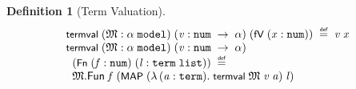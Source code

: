 \documentclass[letterpaper]{article}
\newtheorem{defn}{Definition}
\renewcommand{\HOLConst}[1]{{\textsf{\upshape\small #1}}}
\newenvironment{holmath}{\begin{displaymath}\begin{array}{l}}{\end{array}\end{displaymath}\ignorespacesafterend}
\begin{document}
\begin{defn}[Term Valuation]
\begin{holmath}
  \HOLConst{termval}\;(\HOLFreeVar{\ensuremath{\mathfrak{M}}} :\ensuremath{\alpha}\;\HOLTyOp{model})\;(\HOLFreeVar{v} :\HOLTyOp{num}\;\ensuremath{\rightarrow}\;\ensuremath{\alpha})\;(\HOLConst{fV}\;(\HOLFreeVar{x} :\HOLTyOp{num}))\;\HOLSymConst{\HOLTokenDefEquality{}}\;\HOLFreeVar{v}\;\HOLFreeVar{x}\\
\HOLConst{termval}\;(\HOLFreeVar{\ensuremath{\mathfrak{M}}} :\ensuremath{\alpha}\;\HOLTyOp{model})\;(\HOLFreeVar{v} :\HOLTyOp{num}\;\ensuremath{\rightarrow}\;\ensuremath{\alpha})\\
\;\;(\HOLConst{Fn}\;(\HOLFreeVar{f} :\HOLTyOp{num})\;(\HOLFreeVar{l} :\HOLTyOp{term}\;\HOLTyOp{list}))\;\HOLSymConst{\HOLTokenDefEquality{}}\\
\;\;\HOLFreeVar{\ensuremath{\mathfrak{M}}}.\HOLFieldName{Fun}\;\HOLFreeVar{f}\;(\HOLConst{MAP}\;(\HOLTokenLambda{}(\HOLBoundVar{a} :\HOLTyOp{term}).\;\HOLConst{termval}\;\HOLFreeVar{\ensuremath{\mathfrak{M}}}\;\HOLFreeVar{v}\;\HOLBoundVar{a})\;\HOLFreeVar{l})
\end{holmath}
\end{defn}
\end{document}
